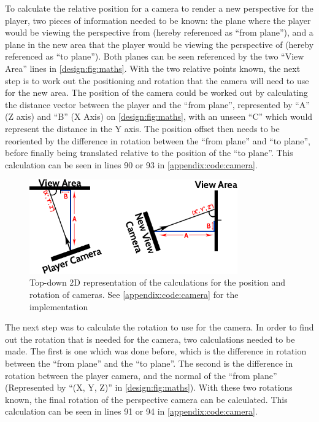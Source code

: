 		To calculate the relative position for a camera to render a new perspective for the player, two pieces of information needed to be known: the plane where the player would be viewing the perspective from (hereby referenced as \enquote{from plane}), and a plane in the new area that the player would be viewing the perspective of (hereby referenced as \enquote{to plane}). Both planes can be seen referenced by the two \enquote{View Area} lines in \autoref{design:fig:maths}.
		With the two relative points known, the next step is to work out the positioning and rotation that the camera will need to use for the new area.
		The position of the camera could be worked out by calculating the distance vector between the player and the \enquote{from plane}, represented by \enquote{A} (Z axis) and \enquote{B} (X Axis) on \autoref{design:fig:maths}, with an unseen \enquote{C} which would represent the distance in the Y axis.
		The position offset then needs to be reoriented by the difference in rotation between the \enquote{from plane} and \enquote{to plane}, before finally being translated relative to the position of the \enquote{to plane}.
		This calculation can be seen in lines 90 or 93 in \autoref{appendix:code:camera}.

		\begin{figure}[h]
			\includegraphics[width=0.8\textwidth]{Images/Position}
			\centering
			\caption{Top-down 2D representation of the calculations for the position and rotation of cameras.
				See \autoref{appendix:code:camera} for the implementation}
			\label{design:fig:maths}
		\end{figure}

		The next step was to calculate the rotation to use for the camera.
		In order to find out the rotation that is needed for the camera, two calculations needed to be made.
		The first is one which was done before, which is the difference in rotation between the \enquote{from plane} and the \enquote{to plane}.
		The second is the difference in rotation between the player camera, and the normal of the \enquote{from plane} (Represented by \enquote{(X\degree, Y\degree, Z\degree)} in \autoref{design:fig:maths}).
		With these two rotations known, the final rotation of the perspective camera can be calculated.
		This calculation can be seen in lines 91 or 94 in \autoref{appendix:code:camera}.

